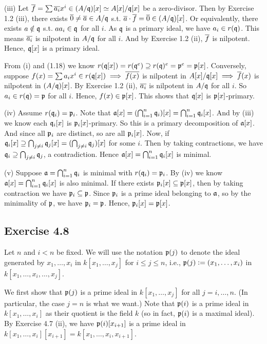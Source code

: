 \documentclass[../A&R.tex]{subfiles}
\begin{document}
(iii) Let $\overline{f}=\sum \overline{a_i}x^i \in (A/\mathfrak{q})[x] \simeq A[x]/\mathfrak{q}[x]$ be a zero-divisor. Then by Exercise 1.2 (iii), there exists $\overline{0} \neq \overline{a} \in A/\mathfrak{q}$ s.t. $\overline{a}\cdot\overline{f} = \overline{0} \in (A/\mathfrak{q})[x]$. Or equivalently, there exists $a \notin \mathfrak{q}$ s.t. $aa_i \in \mathfrak{q}$ for all $i$. As $\mathfrak{q}$ is a primary ideal, we have $a_i \in r(\mathfrak{q})$. This means $\overline{a_i}$ is nilpotent in $A/\mathfrak{q}$ for all $i$. And by Exercise 1.2 (ii), $\overline{f}$ is nilpotent. Hence, $\mathfrak{q}[x]$ is a primary ideal.

From (i) and (1.18) we know $r(\mathfrak{q}[x]) = r(\mathfrak{q}^e) \supseteq r(\mathfrak{q})^e = \mathfrak{p}^e = \mathfrak{p}[x]$. Conversely, suppose $f(x) = \sum a_ix^i \in r(\mathfrak{q}[x]) \implies \overline{f(x)}$ is nilpotent in $A[x]/\mathfrak{q}[x] \implies \overline{f}(x)$ is nilpotent in $(A/\mathfrak{q})[x]$. By Exercise 1.2 (ii), $\overline{a_i}$ is nilpotent in $A/\mathfrak{q}$ for all $i$. So $a_i \in r(\mathfrak{q}) = \mathfrak{p}$ for all $i$. Hence, $f(x) \in \mathfrak{p}[x]$. This shows that $\mathfrak{q}[x]$ is $\mathfrak{p}[x]$-primary.

(iv) Assume $r(\mathfrak{q}_i) = \mathfrak{p}_i$. Note that $\mathfrak{a}[x] = (\bigcap_{i=1}^n \mathfrak{q}_i)[x] = \bigcap_{i=1}^n \mathfrak{q}_i[x]$. And by (iii) we know each $\mathfrak{q}_i[x]$ is $\mathfrak{p}_i[x]$-primary. So this is a primary decomposition of $\mathfrak{a}[x]$. And since all $\mathfrak{p}_i$ are distinct, so are all $\mathfrak{p}_i[x]$. Now, if $\mathfrak{q}_i[x] \supseteq \bigcap_{j\neq i} \mathfrak{q}_j[x] = (\bigcap_{j\neq i} \mathfrak{q}_j) [x]$ for some $i$. Then by taking contractions, we have $\mathfrak{q}_i \supseteq \bigcap_{j\neq i} \mathfrak{q}_j$, a contradiction. Hence $\mathfrak{a}[x] = \bigcap_{i=1}^n \mathfrak{q}_i[x]$ is minimal.

(v) Suppose $\mathfrak{a} = \bigcap_{i=1}^n \mathfrak{q}_i$ is minimal with $r(\mathfrak{q}_i) = \mathfrak{p}_i$. By (iv) we know $\mathfrak{a}[x] = \bigcap_{i=1}^n \mathfrak{q}_i[x]$ is also minimal. If there exists $\mathfrak{p}_i[x] \subseteq \mathfrak{p}[x]$, then by taking contraction we have $\mathfrak{p}_i \subseteq \mathfrak{p}$. Since $\mathfrak{p}_i$ is a prime ideal belonging to $\mathfrak{a}$, so by the minimality of $\mathfrak{p}$, we have $\mathfrak{p}_i = \mathfrak{p}$. Hence, $\mathfrak{p}_i[x] = \mathfrak{p}[x]$.

\subsection*{Exercise 4.8}

Let $n$ and $i<n$ be fixed. We will use the notation $\mathfrak{p}(j)$ to denote the ideal generated by $x_1,\ldots,x_i$ in $k[x_1,\ldots,x_j]$ for $i \leq j \leq n$, i.e., $\mathfrak{p}(j) := (x_1,\ldots,x_i)$ in $k[x_1,\ldots,x_i,\ldots,x_j]$.

We first show that $\mathfrak{p}(j)$ is a prime ideal in $k[x_1,\ldots,x_j]$ for all $j=i,\ldots,n$. (In particular, the case $j=n$ is what we want.) Note that $\mathfrak{p}(i)$ is a prime ideal in $k[x_1,\ldots,x_i]$ as their quotient is the field $k$ (so in fact, $\mathfrak{p}(i)$ is a maximal ideal). By Exercise 4.7 (ii), we have $\mathfrak{p}(i) [x_{i+1}]$ is a prime ideal in $k[x_1,\ldots,x_i][x_{i+1}] = k[x_1,\ldots,x_i,x_{i+1}]$.
\end{document}
